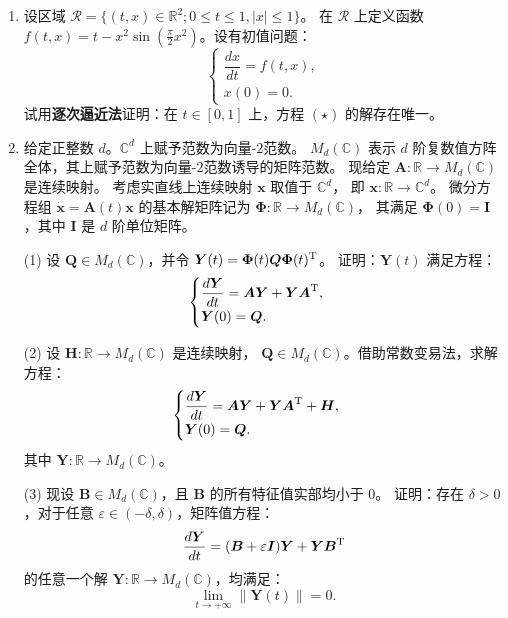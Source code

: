 \begin{enumerate}
\item[5.]设区域 $\mathcal{R} = \{(t, x) \in \mathbb{R}^2; 0 \leqslant t \leqslant 1, |x| \leqslant 1\}$。
在 $\mathcal{R}$ 上定义函数 $f(t, x) = t - x^2 \sin\left(\frac{\pi}{2}x^2\right)$。设有初值问题：
\[
\begin{cases}
\dfrac{dx}{dt} = f(t, x), \\
x(0) = 0.
\end{cases}\tag{$\star$}
\]
试用\textbf{逐次逼近法}证明：在 $t \in [0, 1]$ 上，方程 $(\star)$ 的解存在唯一。

\item[6.]给定正整数 $d$。$\mathbb{C}^d$ 上赋予范数为向量-$2$范数。
$M_d(\mathbb{C})$ 表示 $d$ 阶复数值方阵全体，其上赋予范数为向量-$2$范数诱导的矩阵范数。
现给定 $\boldsymbol{A}: \mathbb{R} \to M_d(\mathbb{C})$ 是连续映射。
考虑实直线上连续映射 $\boldsymbol{x}$ 取值于 $\mathbb{C}^d$，
即 $\boldsymbol{x}: \mathbb{R} \to \mathbb{C}^d$。
微分方程组 $\dot{\boldsymbol{x}} = \boldsymbol{A}(t)\boldsymbol{x}$ 
的基本解矩阵记为 $\boldsymbol{\Phi}: \mathbb{R} \to M_d(\mathbb{C})$，
其满足 $\boldsymbol{\Phi}(0) = \boldsymbol{I}$，其中 $\boldsymbol{I}$ 是 $d$ 阶单位矩阵。

(1)
设 $\boldsymbol{Q} \in M_d(\mathbb{C})$，并令 $\boldsymbol{Y}(t) = \boldsymbol{\Phi}(t)\boldsymbol{Q}\boldsymbol{\Phi}(t)^{\rm T}$。
证明：$\boldsymbol{Y}(t)$ 满足方程：
\[
\begin{cases}
\dfrac{d\boldsymbol{Y}}{dt} = \boldsymbol{AY} + \boldsymbol{YA}^{\rm T}, \\
\boldsymbol{Y}(0) = \boldsymbol{Q}.
\end{cases}
\]

(2)
设 $\boldsymbol{H}: \mathbb{R} \to M_d(\mathbb{C})$ 是连续映射，
$\boldsymbol{Q} \in M_d(\mathbb{C})$。借助常数变易法，求解方程：
\[
\begin{cases}
\dfrac{d\boldsymbol{Y}}{dt} = \boldsymbol{AY} + \boldsymbol{YA}^{\rm T} + \boldsymbol{H}, \\
\boldsymbol{Y}(0) = \boldsymbol{Q}.
\end{cases}
\]
其中 $\boldsymbol{Y}: \mathbb{R} \to M_d(\mathbb{C})$。

(3)
现设 $\boldsymbol{B} \in M_d(\mathbb{C})$，且 $\boldsymbol{B}$ 的所有特征值实部均小于 $0$。
证明：存在 $\delta > 0$，对于任意 $\varepsilon \in (-\delta, \delta)$，矩阵值方程：
\[
\frac{d\boldsymbol{Y}}{dt} = (\boldsymbol{B} + \varepsilon \boldsymbol{I})\boldsymbol{Y} + \boldsymbol{YB}^{\rm T}
\]
的任意一个解 $\boldsymbol{Y}: \mathbb{R} \to M_d(\mathbb{C})$，均满足：
\[
\lim_{t \to +\infty} \| \boldsymbol{Y}(t) \| = 0.
\]



\end{enumerate}
